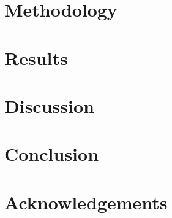 \documentclass{article}
\begin{document}


\section{Methodology}
\label{sec:methods}



\section{Results}
\label{sec:results}



\section{Discussion}
\label{sec:discussion}



\section{Conclusion}
\label{sec:conclusion}



\section{Acknowledgements}
\label{sec:acknowledgements}





\newpage

\begin{appendices}



\newpage



\end{appendices}
\end{document}
